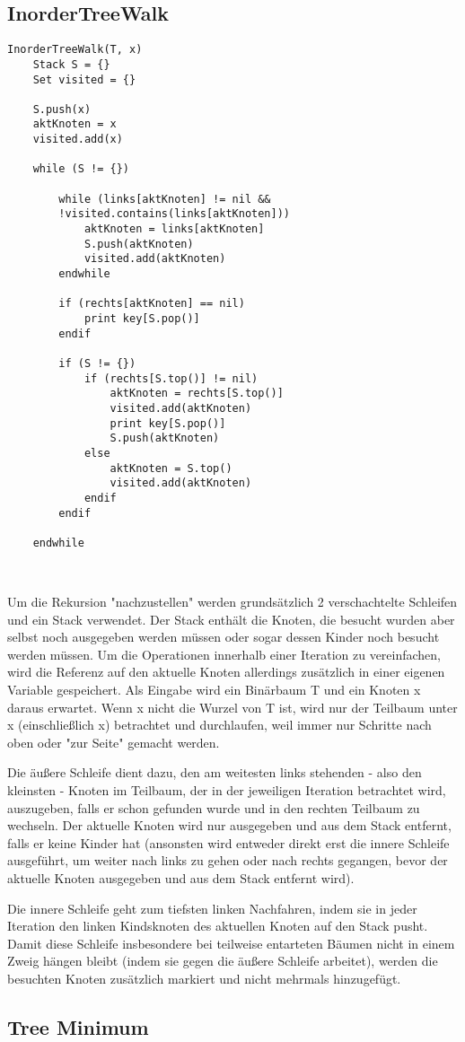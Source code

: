 \subsection*{InorderTreeWalk}

\begin{lstlisting}
InorderTreeWalk(T, x)
	Stack S = {}
	Set visited = {}
	
	S.push(x)
	aktKnoten = x
	visited.add(x)
	
	while (S != {})
	
		while (links[aktKnoten] != nil &&
		!visited.contains(links[aktKnoten]))
			aktKnoten = links[aktKnoten]
			S.push(aktKnoten)
			visited.add(aktKnoten)
		endwhile

		if (rechts[aktKnoten] == nil)
			print key[S.pop()]
		endif
			
		if (S != {})
			if (rechts[S.top()] != nil)
				aktKnoten = rechts[S.top()]
				visited.add(aktKnoten)
				print key[S.pop()]
				S.push(aktKnoten)
			else
				aktKnoten = S.top()
				visited.add(aktKnoten)
			endif
		endif
		
	endwhile
\end{lstlisting}

\begin{tabbing}
\\
\end{tabbing}

Um die Rekursion "nachzustellen" werden grundsätzlich 2 verschachtelte Schleifen und ein Stack verwendet. Der Stack enthält die Knoten, die besucht wurden aber selbst noch ausgegeben werden müssen oder sogar dessen Kinder noch besucht werden müssen. Um die Operationen innerhalb einer Iteration zu vereinfachen, wird die Referenz auf den aktuelle Knoten allerdings zusätzlich in einer eigenen Variable gespeichert. Als Eingabe wird ein Binärbaum T und ein Knoten x daraus erwartet. Wenn x nicht die Wurzel von T ist, wird nur der Teilbaum unter x (einschließlich x) betrachtet und durchlaufen, weil immer nur Schritte nach oben oder "zur Seite" gemacht werden.

Die äußere Schleife dient dazu, den am weitesten links stehenden - also den kleinsten - Knoten im Teilbaum, der in der jeweiligen Iteration betrachtet wird, auszugeben, falls er schon gefunden wurde und in den rechten Teilbaum zu wechseln. 
Der aktuelle Knoten wird nur ausgegeben und aus dem Stack entfernt, falls er keine Kinder hat (ansonsten wird entweder direkt erst die innere Schleife ausgeführt, um weiter nach links zu gehen oder nach rechts gegangen, bevor der aktuelle Knoten ausgegeben und aus dem Stack entfernt wird).

Die innere Schleife geht zum tiefsten linken Nachfahren, indem sie in jeder Iteration den linken Kindsknoten des aktuellen Knoten auf den Stack pusht. 
Damit diese Schleife insbesondere bei teilweise entarteten Bäumen nicht in einem Zweig hängen bleibt (indem sie gegen die äußere Schleife arbeitet), werden die besuchten Knoten zusätzlich markiert und nicht mehrmals hinzugefügt.



\subsection*{Tree Minimum}
